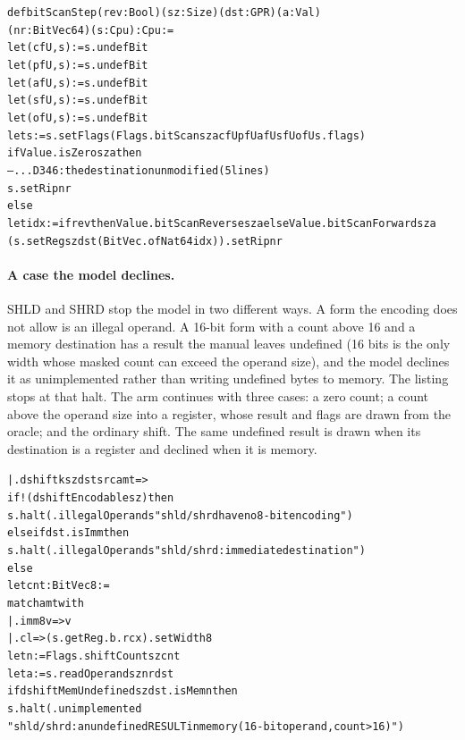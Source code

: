 \documentclass[runningheads]{llncs}
\newcommand{\src}[1]{}  %
\begin{document}
{\scriptsize
\begin{alltt}
def bitScanStep (rev : Bool) (sz : Size) (dst : GPR) (a : Val)
    (nr : BitVec 64) (s : Cpu) : Cpu :=
  let (cfU, s) := s.undefBit
  let (pfU, s) := s.undefBit
  let (afU, s) := s.undefBit
  let (sfU, s) := s.undefBit
  let (ofU, s) := s.undefBit
  let s := s.setFlags (Flags.bitScan sz a cfU pfU afU sfU ofU s.flags)
  if Value.isZero sz a then
    -- ... D346: the destination unmodified (5 lines)
    s.setRip nr
  else
    let idx := if rev then Value.bitScanReverse sz a else Value.bitScanForward sz a
    (s.setReg sz dst (BitVec.ofNat 64 idx)).setRip nr
\end{alltt}
}

\paragraph{A case the model declines.}
SHLD and SHRD stop the model in two different ways. A form the encoding does not allow is an illegal
operand. A 16-bit form with a count above 16 and a memory destination has a result the manual leaves
undefined (16 bits is the only width whose masked count can exceed the operand size), and the model
declines it as unimplemented rather than writing undefined bytes to memory. The listing stops at that
halt. The arm continues with three cases: a zero count; a count above the operand size into a register,
whose result and flags are drawn from the oracle; and the ordinary shift. The same undefined result is
drawn when its destination is a register and declined when it is memory.
\src{X86/Semantics.lean step, the .dshift arm (the n = 0, sz.bits < n and ordinary branches after the halt); Flags.shiftCount masks the count; X86/State.lean inductive MsErr}

{\scriptsize
\begin{alltt}
  | .dshift k sz dst src amt =>
      if !(dshiftEncodable sz) then
        s.halt (.illegalOperands "shld/shrd have no 8-bit encoding")
      else if dst.isImm then
        s.halt (.illegalOperands "shld/shrd: immediate destination")
      else
        let cnt : BitVec 8 :=
          match amt with
          | .imm8 v => v
          | .cl => (s.getReg .b .rcx).setWidth 8
        let n := Flags.shiftCount sz cnt
        let a := s.readOperand sz nr dst
        if dshiftMemUndefined sz dst.isMem n then
          s.halt (.unimplemented
            "shld/shrd: an undefined RESULT in memory (16-bit operand, count > 16)")
\end{alltt}
}
\end{document}
